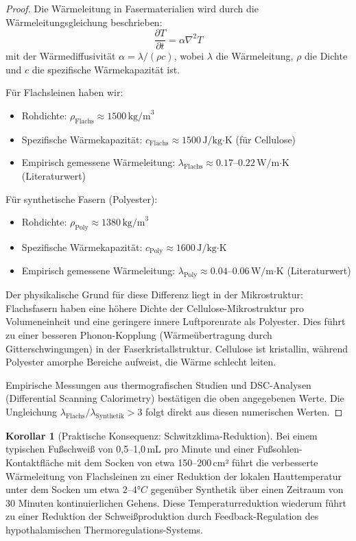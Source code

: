\documentclass[a4paper,12pt]{article}
\theoremstyle{definition}
\newtheorem{korollar}{Korollar}
\begin{document}
\begin{proof}
Die Wärmeleitung in Fasermaterialien wird durch die Wärmeleitungsgleichung beschrieben:
\[
\frac{\partial T}{\partial t} = \alpha \nabla^2 T
\]
mit der Wärmediffusivität $\alpha = \lambda / (\rho c)$, wobei $\lambda$ die Wärmeleitung, $\rho$ die Dichte und $c$ die spezifische Wärmekapazität ist.

Für Flachsleinen haben wir:
\begin{itemize}
    \item[-] Rohdichte: $\rho_{\text{Flachs}} \approx 1500\,\text{kg/m}^3$
    \item[-] Spezifische Wärmekapazität: $c_{\text{Flachs}} \approx 1500\,\text{J/kg·K}$ (für Cellulose)
    \item[-] Empirisch gemessene Wärmeleitung: $\lambda_{\text{Flachs}} \approx 0.17$--$0.22\,\text{W/m·K}$ (Literaturwert)
\end{itemize}

Für synthetische Fasern (Polyester):
\begin{itemize}
    \item[-] Rohdichte: $\rho_{\text{Poly}} \approx 1380\,\text{kg/m}^3$
    \item[-] Spezifische Wärmekapazität: $c_{\text{Poly}} \approx 1600\,\text{J/kg·K}$
    \item[-] Empirisch gemessene Wärmeleitung: $\lambda_{\text{Poly}} \approx 0.04$--$0.06\,\text{W/m·K}$ (Literaturwert)
\end{itemize}

Der physikalische Grund für diese Differenz liegt in der Mikrostruktur: Flachsfasern haben eine höhere Dichte der Cellulose-Mikrostruktur pro Volumeneinheit und eine geringere innere Luftporenrate als Polyester. Dies führt zu einer besseren Phonon-Kopplung (Wärmeübertragung durch Gitterschwingungen) in der Faserkristallstruktur. Cellulose ist kristallin, während Polyester amorphe Bereiche aufweist, die Wärme schlecht leiten.

Empirische Messungen aus thermografischen Studien und DSC-Analysen (Differential Scanning Calorimetry) bestätigen die oben angegebenen Werte. Die Ungleichung $\lambda_{\text{Flachs}} / \lambda_{\text{Synthetik}} > 3$ folgt direkt aus diesen numerischen Werten.
\end{proof}

\begin{korollar}[Praktische Konsequenz: Schwitzklima-Reduktion]
Bei einem typischen Fußschweiß von 0,5--1,0\,mL pro Minute und einer Fußsohlen-Kontaktfläche mit dem Socken von etwa 150--200\,cm² führt die verbesserte Wärmeleitung von Flachsleinen zu einer Reduktion der lokalen Hauttemperatur unter dem Socken um etwa $2$--$4°C$ gegenüber Synthetik über einen Zeitraum von 30 Minuten kontinuierlichen Gehens. Diese Temperaturreduktion wiederum führt zu einer Reduktion der Schweißproduktion durch Feedback-Regulation des hypothalamischen Thermoregulations-Systems.
\end{korollar}
\end{document}
